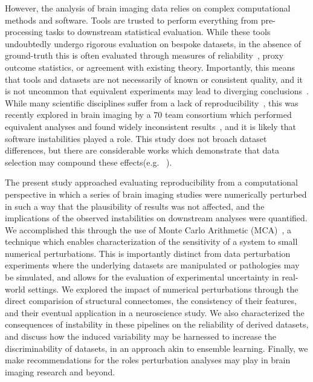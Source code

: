 \documentclass[10pt,letterpaper]{article}
\begin{document}
However, the analysis of brain imaging data relies on complex computational methods
and software. Tools are trusted to perform everything from pre-processing tasks to
downstream statistical evaluation. While these tools undoubtedly undergo rigorous
evaluation on bespoke datasets, in the absence of ground-truth this is often evaluated 
through measures of reliability~\cite{Bartko1966-tl,Brandmaier2018-tk,bridgeford2020elim,Kiar2018-jt,antonakakis2020inter}, proxy outcome
statistics, or agreement with existing theory. Importantly, this means that tools and
datasets are not necessarily of known or consistent quality, and it is not uncommon
that equivalent experiments may lead to diverging conclusions~\cite{botvinik2020variability,bennet2009neural,eklund2016cluster,Kiar2020-lb,Lewis2017-ll,Glatard2015-vc,salari2020file}. While many scientific
disciplines suffer from a lack of reproducibility~\cite{baker20161}, this was recently 
explored in brain imaging by a $70$ team consortium which performed equivalent
analyses and found widely inconsistent results~\cite{botvinik2020variability}, and it
is likely that software instabilities played a role. This study does not broach
dataset differences, but there are considerable works which demonstrate that data
selection may compound these effects(e.g. ~\cite{antonakakis2020inter,bridgeford2020elim}).

The present study approached evaluating reproducibility from a computational
perspective in which a series of brain imaging studies were numerically perturbed
in such a way that the plausibility of results was not affected, and the implications
of the observed instabilities on downstream analyses were quantified. We accomplished
this through the use of Monte Carlo Arithmetic (MCA)~\cite{Parker1997-qq,Denis2016-wo},
a technique which enables characterization of the sensitivity of a system to small
numerical perturbations. This is importantly distinct from data perturbation
experiments where the underlying datasets are manipulated or pathologies may be
simulated, and allows for the evaluation of experimental uncertainty in real-world
settings. We explored the impact of numerical perturbations through the direct
comparision of structural connectomes, the consistency of their features, and their
eventual application in a neuroscience study. We also characterized the consequences
of instability in these pipelines on the reliability of derived datasets, and discuss
how the induced variability may be harnessed to increase the discriminability of
datasets, in an approach akin to ensemble learning. Finally, we make recommendations
for the roles perturbation analyses may play in brain imaging research and beyond.
\end{document}
